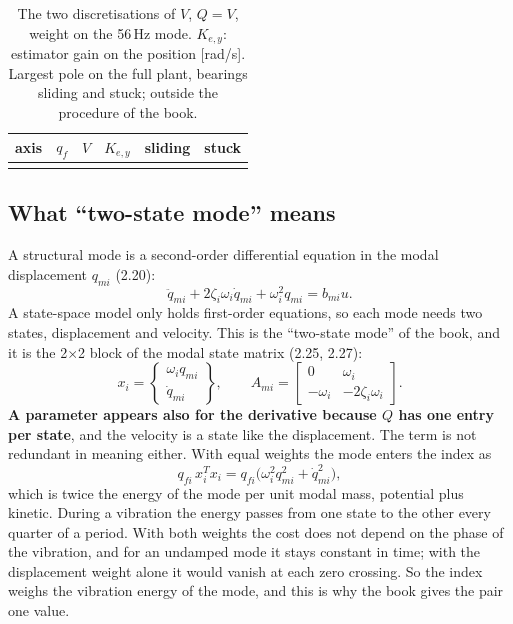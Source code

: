 \documentclass[10pt,a4paper]{article}
\numberwithin{equation}{section}
\begin{document}
\begin{table}[H]\centering\footnotesize
\caption{The two discretisations of $V$, $Q=V$, weight on the 56\,Hz mode. $K_{e,y}$: estimator gain on the position [rad/s]. Largest pole on the full plant, bearings sliding and stuck; outside the procedure of the book.}\label{tab:s1v}
\begin{tabular}{lrlrll}\toprule
axis & $q_f$ & $V$ & $K_{e,y}$ & sliding & stuck \\ \midrule
\\ \bottomrule
\end{tabular}\end{table}

\subsection{What ``two-state mode'' means}
A structural mode is a second-order differential equation in the modal displacement $q_{mi}$ (2.20):
\begin{equation}
\ddot q_{mi}+2\zeta_i\omega_i\dot q_{mi}+\omega_i^2q_{mi}=b_{mi}u .
\end{equation}
A state-space model only holds first-order equations, so each mode needs two states, displacement and velocity. This is the ``two-state mode'' of the book, and it is the 2$\times$2 block of the modal state matrix (2.25, 2.27):
\begin{equation}
x_i=\begin{Bmatrix}\omega_iq_{mi}\\\dot q_{mi}\end{Bmatrix},\qquad
A_{mi}=\begin{bmatrix}0&\omega_i\\-\omega_i&-2\zeta_i\omega_i\end{bmatrix}.
\end{equation}
\textbf{A parameter appears also for the derivative because $Q$ has one entry per state}, and the velocity is a state like the displacement. The term is not redundant in meaning either. With equal weights the mode enters the index as
\begin{equation}
q_{fi}\,x_i^Tx_i=q_{fi}\bigl(\omega_i^2q_{mi}^2+\dot q_{mi}^2\bigr),
\end{equation}
which is twice the energy of the mode per unit modal mass, potential plus kinetic. During a vibration the energy passes from one state to the other every quarter of a period. With both weights the cost does not depend on the phase of the vibration, and for an undamped mode it stays constant in time; with the displacement weight alone it would vanish at each zero crossing. So the index weighs the vibration energy of the mode, and this is why the book gives the pair one value.
\end{document}
